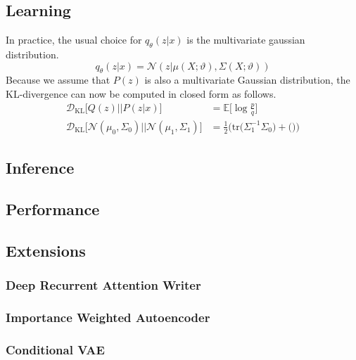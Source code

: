 \documentclass[twoside,11pt,a4paper]{article}
\theoremstyle{break}
\begin{document}
\subsection{Learning}
\label{sub:vae_learning}
In practice, the usual choice for $q_\theta(z|x)$ is the multivariate gaussian distribution.
$$
q_\theta(z|x) = \mathcal{N}(z|\mu(X;\vartheta), \Sigma(X;\vartheta))
$$
Because we assume that $P(z)$ is also a multivariate Gaussian distribution, the KL-divergence can now be computed in closed form as follows\cite{derivations:2007}.
\begin{align*}
  \mathcal{D}_{\mathrm{KL}}\big[Q(z) || P(z|x)\big] &= \mathbb{E}\big[\log \frac{p}{q}\big]\\
  \mathcal{D}_{\mathrm{KL}}\big[\mathcal{N}(\mu_0,\Sigma_0) || \mathcal{N}(\mu_1,\Sigma_1)\big]
  &= \frac{1}{2} \big(\mathrm{tr}\big(\Sigma_1^{-1}\Sigma_0\big) + \big(\big)\big)
\end{align*}


\subsection{Inference}
\label{sub:vae_inference}

\subsection{Performance}
\label{sub:vae_performance}

\subsection{Extensions}
\label{sub:vae_extensions}

\subsubsection{Deep Recurrent Attention Writer}
\label{ssub:vae_deep_recurrent_attention_writer}

\subsubsection{Importance Weighted Autoencoder}
\label{ssub:vae_importance_weighted_autoencoder}

\subsubsection{Conditional VAE}
\label{ssub:vae_conditional_vae}
\end{document}
